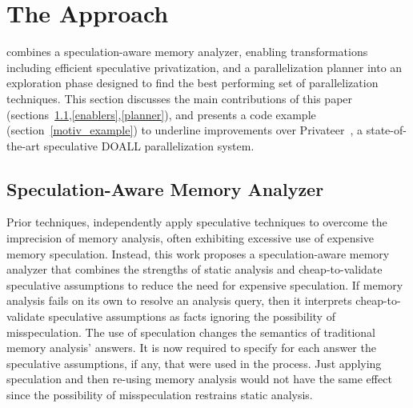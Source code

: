 \section{The \name Approach}

\name combines a speculation-aware memory analyzer, enabling
transformations including efficient speculative privatization, and a
parallelization planner into an exploration phase designed to find the
best performing set of parallelization techniques.  This section
discusses the main contributions of this paper
(sections~\ref{analyzer},\ref{enablers},\ref{planner}), and
presents a code example (section~\ref{motiv_example}) to underline
improvements over Privateer~\cite{johnson:12:pldi}, a state-of-the-art
speculative DOALL parallelization system.

\subsection{Speculation-Aware Memory Analyzer}
\label{analyzer}

%
Prior techniques, independently apply speculative techniques to
overcome the imprecision of memory analysis, often exhibiting
excessive use of expensive memory speculation.
%
%
%
%
Instead, this work proposes a speculation-aware memory analyzer that
combines the strengths of static analysis and cheap-to-validate
speculative assumptions to reduce the need for expensive speculation.
If memory analysis fails on its own to resolve an analysis query, then
it interprets cheap-to-validate speculative assumptions as facts
ignoring the possibility of misspeculation.
%
The use of speculation changes the semantics of traditional memory
analysis' answers. It is now required to specify for each answer the
speculative assumptions, if any, that were used in the process.
%
Just applying speculation and then re-using memory analysis would not
have the same effect since the possibility of misspeculation restrains
static analysis.

%
%

